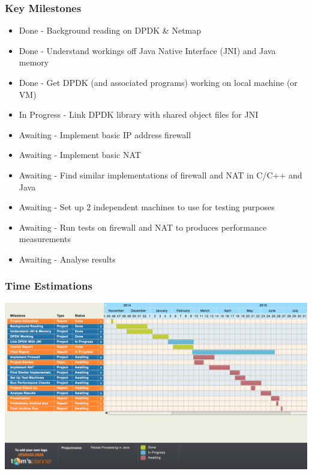 \documentclass[a4paper, titlepage]{article}
\begin{document}
\subsubsection{Key Milestones}
\begin{itemize}
	\item Done - Background reading on DPDK \& Netmap
	\item Done - Understand workings off Java Native Interface (JNI) and Java memory
	\item Done - Get DPDK (and associated programs) working on local machine (or VM)
	\item In Progress - Link DPDK library with shared object files for JNI
	\item Awaiting - Implement basic IP address firewall
	\item Awaiting - Implement basic NAT
	\item Awaiting - Find similar implementations of firewall and NAT in C/C++ and Java
	\item Awaiting - Set up 2 independent machines to use for testing purposes
	\item Awaiting - Run tests on firewall and NAT to produces performance measurements
	\item Awaiting - Analyse results
\end{itemize}

\subsubsection{Time Estimations}
\begin{center}
	\includegraphics[width=\textwidth]{images/timeline.png}
\end{center}
\end{document}
